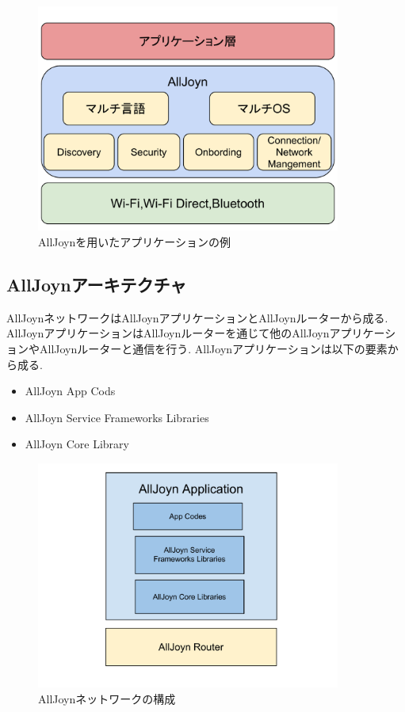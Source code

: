 \begin{figure}[htbp]
\centering
\includegraphics[width=10cm]{fig/AllJoyn_App.pdf}
\caption{AllJoynを用いたアプリケーションの例}
\end{figure}

\subsection{AllJoynアーキテクチャ}

AllJoynネットワークはAllJoynアプリケーションとAllJoynルーターから成る.
AllJoynアプリケーションはAllJoynルーターを通じて他のAllJoynアプリケーションやAllJoynルーターと通信を行う.
AllJoynアプリケーションは以下の要素から成る.

\begin{itemize}
\item AllJoyn App Cods
\item AllJoyn Service Frameworks Libraries
\item AllJoyn Core Library
\end{itemize}

\begin{figure}[htbp]
\centering
\includegraphics[width=10cm]{fig/AllJoyn.pdf}
\caption{AllJoynネットワークの構成}
\end{figure}

